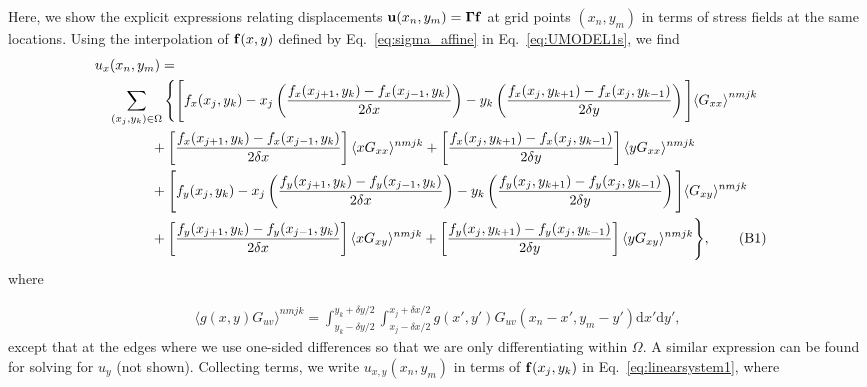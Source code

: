 \documentclass[aps,prl,reprint,groupedaddress,twocolumn]{revtex4-1}
\def\dd{\mbox{d}}
\def\f{{\bf f}}
\def\u{{\bf u}}
\begin{document}
\begin{appendix}
Here, we show the explicit expressions relating displacements $\u(x_{n}, y_{m}) = \boldsymbol\Gamma \f$ at 
grid points $(x_{n},y_{m})$ in terms of stress fields at the same locations. Using 
the interpolation of $\f(x,y)$ defined by Eq.~\ref{eq:sigma_affine} in 
Eq.~\ref{eq:UMODEL1s}, we find
%
\begin{align}
\lefteqn{u_x(x_n,y_m) =}  \nonumber\\
 & \quad \sum_{(x_j,y_k)\in\Omega} \Bigg\{ \Bigg[f_{x}(x_j,y_k)
- x_j\left(\frac{f_{x}(x_{j+1},y_k) - f_{x}(x_{j-1},y_k)}{2\delta x}\right)
 -y_k\left( \frac{f_{x}(x_j,y_{k+1}) -
f_{x}(x_j,y_{k-1})}{2\delta y}\right) \Bigg]{\langle G_{xx} \rangle}^{nmjk} \nonumber \\
& \qquad\qquad +\left[ \frac{f_{x}(x_{j+1},y_k) -
f_{x}(x_{j-1},y_k)}{2\delta x}\right]\langle xG_{xx} \rangle^{nmjk} 
+ \left[  \frac{f_{x}(x_j,y_{k+1}) - f_{x}(x_j,y_{k-1}) }{2\delta y} \right]
\langle yG_{xx} \rangle^{nmjk}\nonumber\\
&\qquad\qquad + \Bigg[f_{y}(x_j,y_k)-x_j\left(\frac{f_{y}(x_{j+1},y_k)-
f_{y}(x_{j-1},y_k) }{2\delta x}\right)-y_k\left( \frac{f_{y}(x_j,y_{k+1}) 
-f_{y}(x_j,y_{k-1}) }{2\delta y}\right) \Bigg] \langle G_{xy} \rangle^{nmjk}\nonumber \\
&\qquad\qquad +\left[ \frac{f_{y}(x_{j+1},y_k) - f_{y}(x_{j-1},y_k) }{2\delta x}\right]  
\langle xG_{xy} \rangle^{nmjk} + 
\left[\frac{f_{y}(x_j,y_{k+1}) - 
f_{y}(x_j,y_{k-1}) }{2\delta y}\right]\langle yG_{xy} \rangle^{nmjk} \Bigg\},
\tag{B1}
\end{align}
%
where

\begin{align}
\langle g(x,y)G_{uv} \rangle^{nmjk} = \int_{y_k-\delta y/2}^{y_k+\delta y/2} 
\int_{x_j-\delta x/2}^{x_j+\delta x/2} g(x',y')
G_{uv}(x_n-x',y_m-y')\dd x'\dd y',\label{eq:G_ave} \tag{B2}
\end{align}
%
except that at the edges where we use one-sided differences so that we
are only differentiating within $\Omega$. A similar expression can be
found for solving for $u_y$ (not shown). Collecting terms, we 
write $u_{x,y}(x_{n},y_{m})$ in terms of $\f(x_{j}, y_{k})$ 
in Eq.~\ref{eq:linearsystem1}, where 


\end{appendix}
\end{document}
